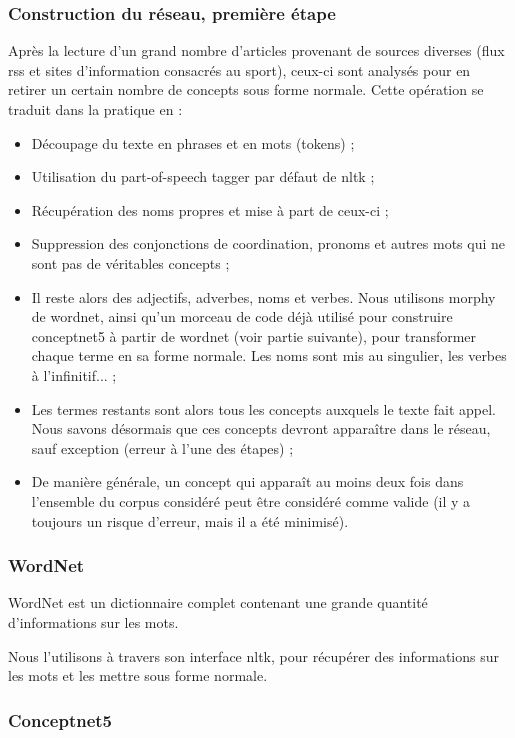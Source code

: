 \documentclass{article}           %
\begin{document}
\subsubsection{Construction du réseau, première étape}

Après la lecture d'un grand nombre d'articles provenant de sources diverses (flux rss et sites d'information consacrés au sport), ceux-ci sont analysés pour en retirer un certain nombre de concepts sous forme normale. Cette opération se traduit dans la pratique en :
\begin{itemize}
 \item Découpage du texte en phrases et en mots (tokens) ;
 \item Utilisation du part-of-speech tagger par défaut de nltk ;
 \item Récupération des noms propres et mise à part de ceux-ci ;
 \item Suppression des conjonctions de coordination, pronoms et autres mots qui ne sont pas de véritables concepts ;
 \item Il reste alors des adjectifs, adverbes, noms et verbes. Nous utilisons morphy de wordnet, ainsi qu'un morceau de code déjà utilisé pour construire conceptnet5 à partir de wordnet (voir partie suivante), pour transformer chaque terme en sa forme normale. Les noms sont mis au singulier, les verbes à l'infinitif... ;
 \item Les termes restants sont alors tous les concepts auxquels le texte fait appel. Nous savons désormais que ces concepts devront apparaître dans le réseau, sauf exception (erreur à l'une des étapes) ;
 \item De manière générale, un concept qui apparaît au moins deux fois dans l'ensemble du corpus considéré peut être considéré comme valide (il y a toujours un risque d'erreur, mais il a été minimisé).
\end{itemize}


\subsubsection{WordNet}

WordNet est un dictionnaire complet contenant une grande quantité d'informations sur les mots.

Nous l'utilisons à travers son interface nltk, pour récupérer des informations sur les mots et les mettre sous forme normale.


\subsubsection{Conceptnet5}
\end{document}
